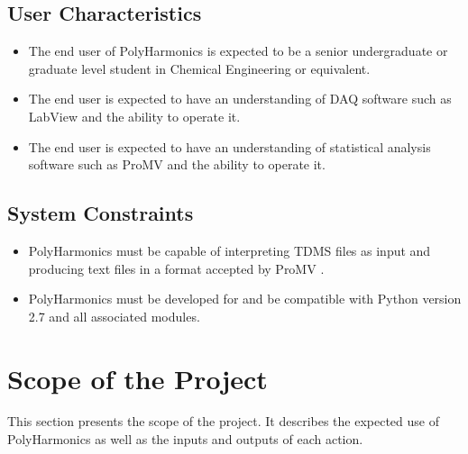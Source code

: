 \documentclass[12pt]{article}
\newcommand{\progname}{PolyHarmonics}
\begin{document}

\subsection{User Characteristics}
\begin{itemize}
\item The end user of \progname{} is expected to be a senior undergraduate or
 graduate level student in Chemical Engineering or equivalent.
 \item The end user is expected to have an understanding of DAQ software such
 as LabView and the ability to operate it.
 \item The end user is expected to have an understanding of statistical analysis
 software such as ProMV and the ability to operate it.
\end{itemize}
\subsection{System Constraints}

\begin{itemize}
\item \progname{} must be capable of interpreting TDMS files as input \cite{TDMS} 
and producing text files in a format accepted by ProMV \cite{ProMV}.  
\item \progname{} must be developed for and be compatible with Python version
  2.7 and all associated modules.
\end{itemize}


\section{Scope of the Project}

This section presents the scope of the project. It describes the expected use of
\progname{} as well as the inputs and outputs of each action.
\end{document}

